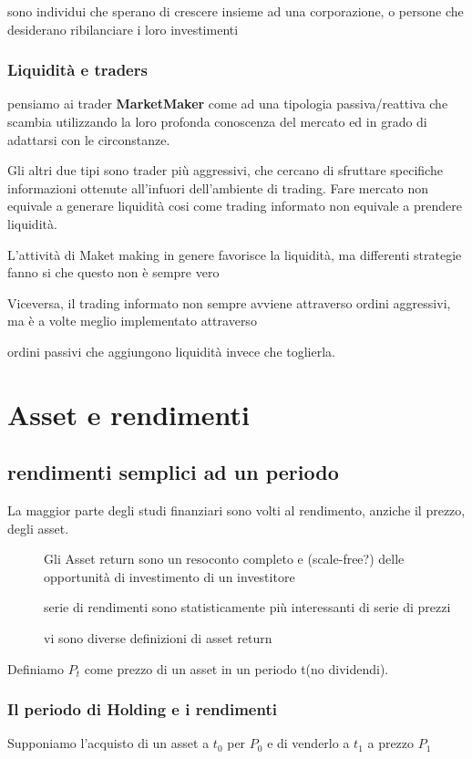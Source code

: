 \documentclass[a4paper,11pt]{report}
\begin{document}
{	sono individui che sperano di crescere insieme ad una corporazione, o persone che desiderano ribilanciare i loro investimenti

\subsection{Liquidità e traders}
	pensiamo ai trader \textbf{MarketMaker} come ad una tipologia passiva/reattiva che scambia utilizzando la loro profonda 			conoscenza del mercato ed in grado di adattarsi con le circonstanze. 
	
	Gli altri due tipi sono trader più aggressivi, che cercano di sfruttare specifiche informazioni ottenute all'infuori dell'ambiente di 		trading. \newline
	Fare mercato non equivale a generare liquidità cosi come trading informato non equivale a prendere liquidità.

	L'attività di Maket making in genere favorisce la liquidità, ma differenti strategie fanno si che questo non è sempre vero

	Viceversa, il trading informato non sempre avviene attraverso ordini aggressivi, ma è a volte meglio implementato attraverso

	ordini passivi che aggiungono liquidità invece che toglierla.

\chapter{Asset e rendimenti}
	\section{rendimenti semplici ad un periodo}
	La maggior parte degli studi finanziari sono volti al rendimento, anziche il prezzo, degli asset.
\begin{description}
	\item[] Gli Asset return sono un resoconto completo e (scale-free?) delle opportunità di investimento di un investitore
	\item[] serie di rendimenti sono statisticamente più interessanti di serie di prezzi
	\item[] vi sono diverse definizioni di asset return
\end{description}
Definiamo $P_t$ come prezzo di un asset in un periodo t(no dividendi). \newline
\subsection{Il periodo di Holding e i rendimenti}
	Supponiamo l'acquisto di un asset a $t_0$ per $P_0$ e di venderlo a $t_1$ a prezzo $P_1$

}
\end{document}
